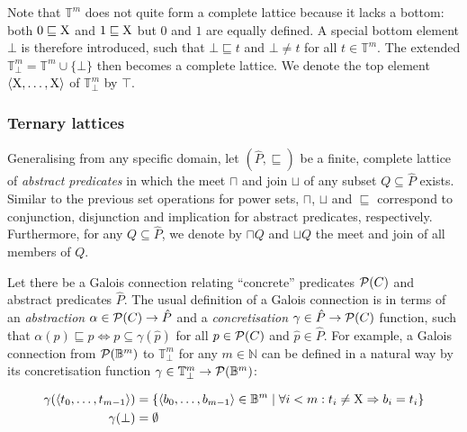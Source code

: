 

Note that $\mathbb{T}^{m}$ does not quite form a complete lattice because it lacks a bottom: both $0 \sqsubseteq \mathrm{X}$ and $1 \sqsubseteq \mathrm{X}$ but $0$ and $1$ are equally defined. A special bottom element $\bot$ is therefore introduced, such that $\bot \sqsubseteq t$ and $\bot \neq t$ for all $t \in \mathbb{T}^{m}$. The extended $\mathbb{T}_{\bot}^{m} = \mathbb{T}^{m} \cup \{ \bot \}$ then becomes a complete lattice. We denote the top element $\langle \mathrm{X}, \dots, \mathrm{X} \rangle$ of $\mathbb{T}_{\bot}^{m}$ by $\top$.

\subsubsection{Ternary lattices}

Generalising from any specific domain, let $(\hat P,\sqsubseteq)$ be a finite, complete lattice of \textit{abstract predicates} in which the meet $\sqcap$ and join $\sqcup$ of any subset $Q \subseteq \hat P$ exists. Similar to the previous set operations for power sets, $\sqcap$, $\sqcup$ and $\sqsubseteq$ correspond to conjunction, disjunction and implication for abstract predicates, respectively. Furthermore, for any $Q \subseteq \hat P$, we denote by $\sqcap Q$ and $\sqcup Q$ the meet and join of all members of $Q$.

Let there be a Galois connection relating ``concrete'' predicates $\mathcal{P}(C)$ and abstract predicates $\hat P$. The usual definition of a Galois connection is in terms of an \textit{abstraction} $\alpha \in \mathcal{P}(C) \rightarrow \hat P$ and a \textit{concretisation} $\gamma \in \hat P \rightarrow \mathcal{P}(C)$ function, such that $\alpha(p) \sqsubseteq \hat p \iff p \subseteq \gamma(\hat p)$ for all $p \in \mathcal{P}(C)$ and $\hat p \in \hat P$. For example, a Galois connection from $\mathcal{P}(\mathbb{B}^{m})$ to $\mathbb{T}_{\bot}^{m}$ for any $m \in \mathbb{N}$ can be defined in a natural way by its concretisation function $\gamma \in \mathbb{T}_{\bot}^{m} \rightarrow \mathcal{P}(\mathbb{B}^{m})$:

\begin{align*}
\gamma ( \langle t_{0}, \dots,t_{m-1} \rangle ) &= \{ \langle b_{0}, \dots,b_{m-1} \rangle \in \mathbb{B}^{m} \mid \forall i < m : t_{i} \neq \mathrm{X} \Rightarrow b_{i} = t_{i} \} \\
\gamma ( \bot ) &= \emptyset
\end{align*}


